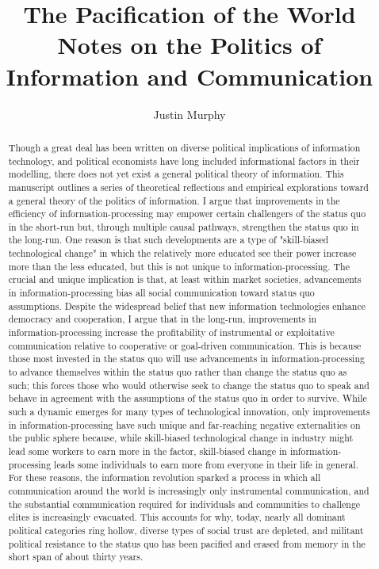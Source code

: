 \documentclass[12pt,book]{article}
\title{The Pacification of the World Notes on the Politics of Information and
Communication}
\author{Justin Murphy}
\date{}
\begin{document}
\maketitle


\clearpage

\begin{abstract} 
Though a great deal has been written on diverse political implications of information technology, and political economists have long included informational factors in their modelling, there does not yet exist a general political theory of information. This manuscript outlines a series of theoretical reflections and empirical explorations toward a general theory of the politics of information. I argue that improvements in the efficiency of information-processing may empower certain challengers of the status quo in the short-run but, through multiple causal pathways, strengthen the status quo in the long-run. One reason is that such developments are a type of "skill-biased technological change" in which the relatively more educated see their power increase more than the less educated, but this is not unique to information-processing. The crucial and unique implication is that, at least within market societies, advancements in information-processing bias all social communication toward status quo assumptions. Despite the widespread belief that new information technologies enhance democracy and cooperation, I argue that in the long-run, improvements in information-processing increase the profitability of instrumental or exploitative communication relative to cooperative or goal-driven communication. This is because those most invested in the status quo will use advancements in information-processing to advance themselves within the status quo rather than change the status quo as such; this forces those who would otherwise seek to change the status quo to speak and behave in agreement with the assumptions of the status quo in order to survive. While such a dynamic emerges for many types of technological innovation, only improvements in information-processing have such unique and far-reaching negative externalities on the public sphere because, while skill-biased technological change in industry might lead some workers to earn more in the factor, skill-biased change in information-processing leads some individuals to earn more from everyone in their life in general. For these reasons, the information revolution sparked a process in which all communication around the world is increasingly only instrumental communication, and the substantial communication required for individuals and communities to challenge elites is increasingly evacuated. This accounts for why, today, nearly all dominant political categories ring hollow, diverse types of social trust are depleted, and militant political resistance to the status quo has been pacified and erased from memory in the short span of about thirty years.
\end{abstract}
\end{document}
